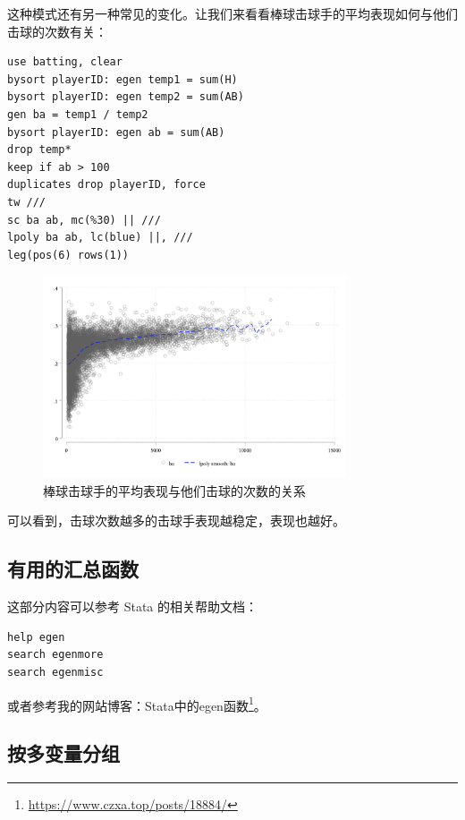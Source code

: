 \documentclass[]{ctexbook}
\renewcommand{\href}[2]{#2\footnote{\url{#1}}}
\begin{document}
这种模式还有另一种常见的变化。让我们来看看棒球击球手的平均表现如何与他们击球的次数有关：

\begin{lstlisting}
use batting, clear
bysort playerID: egen temp1 = sum(H)
bysort playerID: egen temp2 = sum(AB)
gen ba = temp1 / temp2
bysort playerID: egen ab = sum(AB)
drop temp*
keep if ab > 100
duplicates drop playerID, force
tw ///
sc ba ab, mc(%30) || ///
lpoly ba ab, lc(blue) ||, ///
leg(pos(6) rows(1))
\end{lstlisting}

\begin{figure}

{\centering \includegraphics[width=0.8\textwidth]{assets/scbaab} 

}

\caption{棒球击球手的平均表现与他们击球的次数的关系}\label{fig:scbaab}
\end{figure}

可以看到，击球次数越多的击球手表现越稳定，表现也越好。

\hypertarget{section-54}{%
\subsection{有用的汇总函数}\label{section-54}}

这部分内容可以参考 Stata 的相关帮助文档：

\begin{lstlisting}
help egen 
search egenmore
search egenmisc
\end{lstlisting}

或者参考我的网站博客：\href{https://www.czxa.top/posts/18884/}{Stata中的egen函数}。

\hypertarget{section-55}{%
\subsection{按多变量分组}\label{section-55}}
\end{document}
